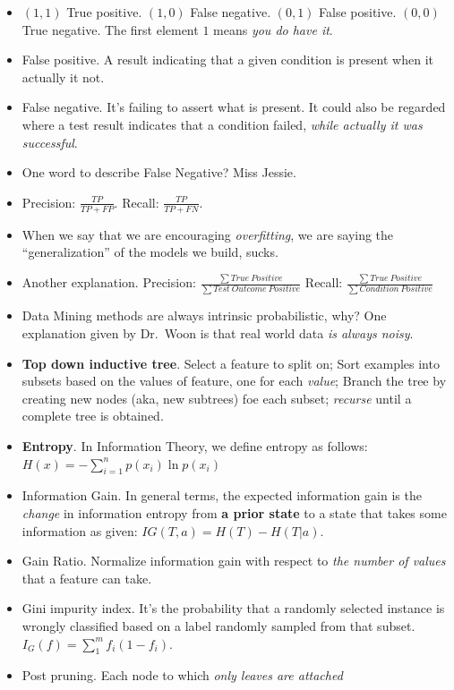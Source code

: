 \documentclass[twocolumn]{article}
\begin{document}
\begin{itemize}
\begin{figure}[htbp]
  \end{figure}
\item $(1,1)$ True positive. $(1,0)$ False negative. $(0,1)$ False
  positive. $(0,0)$ True negative. The first element $1$ means
  \emph{you do have it}.
\item False positive. A result indicating that a given condition is
  present when it actually it not.
\item False negative. It's failing to assert what is present. It could
  also be regarded where a test result indicates that a condition
  failed, \emph{while actually it was successful}.
\item One word to describe False Negative? Miss Jessie.
\item Precision: $\frac{TP}{TP+FP}$. Recall: $\frac{TP}{TP+FN}$.
\item When we say that we are encouraging \emph{overfitting}, we are
  saying the ``generalization'' of the models we build, sucks. 
\item Another explanation. Precision: $\frac{\sum
    True~Positive}{\sum Test~Outcome~Positive}$ Recall: $\frac{\sum
    True~Positive}{\sum Condition~Positive}$
\item Data Mining methods are always intrinsic probabilistic, why? One
  explanation given by Dr.\ Woon is that real world data \emph{is
    always noisy}.
\item \textbf{Top down inductive tree}. Select a feature to split on;
  Sort examples into subsets based on the values of feature, one for
  each \emph{value}; Branch the tree by creating new nodes (aka, new
  subtrees) foe each subset; \emph{recurse} until a complete tree is
  obtained. 
\item \textbf{Entropy}. In Information Theory, we define entropy as
  follows: $H(x)=-\sum_{i=1}^{n}p(x_{i})\ln p(x_{i})$
\item Information Gain. In general terms, the expected information
  gain is the \emph{change} in information entropy from \textbf{a
    prior state} to a state that takes some information as given:
  $IG(T,a)=H(T)-H(T|a)$.
\item Gain Ratio. Normalize information gain with respect to \emph{the
  number of values} that a feature can take.
\item Gini impurity index. It's the probability that a randomly
  selected instance is wrongly classified based on a label randomly
  sampled from that subset. $I_{G}(f)=\sum_{1}^{m}f_{i}(1-f_{i})$.
\item Post pruning. Each node to which \emph{only leaves are attached}

\end{itemize}
\end{document}
